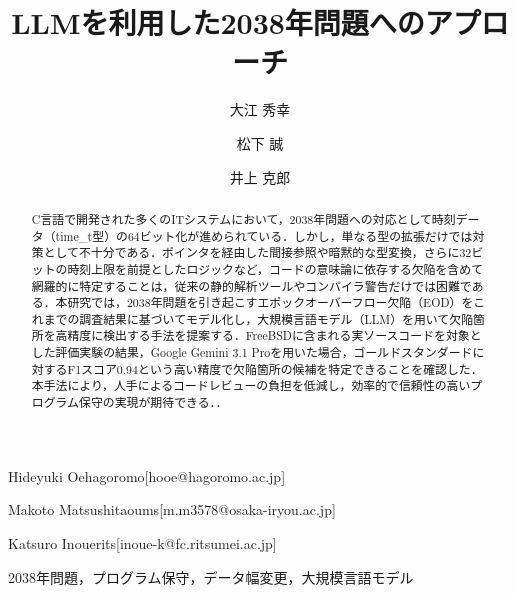 \documentclass[submit,techrep,noauthor]{ipsj-lualatex}
\begin{document}
\title{LLMを利用した2038年問題へのアプローチ}



\author{大江 秀幸}{Hideyuki Oe}{hagoromo}[hooe@hagoromo.ac.jp]
\author{松下 誠}{Makoto Matsushita}{oums}[m.m3578@osaka-iryou.ac.jp]
\author{井上 克郎}{Katsuro Inoue}{rits}[inoue-k@fc.ritsumei.ac.jp]

\begin{abstract}
	C言語で開発された多くのITシステムにおいて，2038年問題への対応として時刻データ（time\_t型）の64ビット化が進められている．しかし，単なる型の拡張だけでは対策として不十分である．ポインタを経由した間接参照や暗黙的な型変換，さらに32ビットの時刻上限を前提としたロジックなど，コードの意味論に依存する欠陥を含めて網羅的に特定することは，従来の静的解析ツールやコンパイラ警告だけでは困難である．本研究では，2038年問題を引き起こすエポックオーバーフロー欠陥（EOD）をこれまでの調査結果に基づいてモデル化し，大規模言語モデル（LLM）を用いて欠陥箇所を高精度に検出する手法を提案する．FreeBSDに含まれる実ソースコードを対象とした評価実験の結果，Google Gemini 3.1 Proを用いた場合，ゴールドスタンダードに対するF1スコア0.94という高い精度で欠陥箇所の候補を特定できることを確認した．本手法により，人手によるコードレビューの負担を低減し，効率的で信頼性の高いプログラム保守の実現が期待できる．．
\end{abstract}

\begin{jkeyword}
2038年問題，プログラム保守，データ幅変更，大規模言語モデル
\end{jkeyword}
\end{document}
